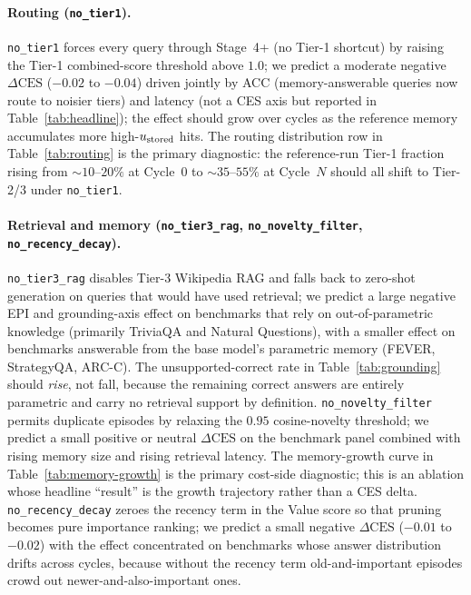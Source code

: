 \paragraph{Routing (\texttt{no\_tier1}).}
\texttt{no\_tier1} forces every query through Stage~4+ (no Tier-1
shortcut) by raising the Tier-1 combined-score threshold above $1.0$;
we predict a moderate negative $\Delta\text{CES}$ ($-0.02$ to $-0.04$)
driven jointly by ACC (memory-answerable queries now route to noisier
tiers) and latency (not a CES axis but reported in
Table~\ref{tab:headline}); the effect should grow over cycles as the
reference memory accumulates more high-$u_{\text{stored}}$ hits. The routing
distribution row in Table~\ref{tab:routing} is the primary diagnostic:
the reference-run Tier-1 fraction rising from $\sim 10$--$20\%$ at
Cycle~0 to $\sim 35$--$55\%$ at Cycle~$N$ should all shift to Tier-2/3
under \texttt{no\_tier1}.

\paragraph{Retrieval and memory
(\texttt{no\_tier3\_rag}, \texttt{no\_novelty\_filter},
\texttt{no\_recency\_decay}).}
\texttt{no\_tier3\_rag} disables Tier-3 Wikipedia RAG and falls back
to zero-shot generation on queries that would have used retrieval;
we predict a large negative EPI and grounding-axis effect on
benchmarks that rely on out-of-parametric knowledge (primarily
TriviaQA and Natural Questions), with a smaller effect on benchmarks
answerable from the base model's parametric memory (FEVER,
StrategyQA, ARC-C). The unsupported-correct rate in
Table~\ref{tab:grounding} should \emph{rise}, not fall, because the
remaining correct answers are entirely parametric and carry no
retrieval support by definition. \texttt{no\_novelty\_filter} permits
duplicate episodes by relaxing the $0.95$ cosine-novelty threshold; we
predict a small positive or neutral $\Delta\text{CES}$ on the
benchmark panel combined with rising memory size and rising retrieval
latency. The memory-growth curve in Table~\ref{tab:memory-growth} is
the primary cost-side diagnostic; this is an ablation whose headline
``result'' is the growth trajectory rather than a CES delta.
\texttt{no\_recency\_decay} zeroes the recency term in the Value score
so that pruning becomes pure importance ranking; we predict a small
negative $\Delta\text{CES}$ ($-0.01$ to $-0.02$) with the effect
concentrated on benchmarks whose answer distribution drifts across
cycles, because without the recency term old-and-important episodes
crowd out newer-and-also-important ones.

